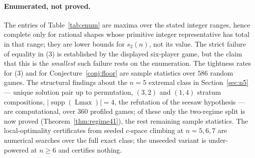 \documentclass[11pt]{article}
\newcommand{\Lmax}{\operatorname{Lmax}}
\newcommand{\supp}{\operatorname{supp}}
\begin{document}
\paragraph{Enumerated, not proved.}
The entries of Table~\ref{tab:enum} are maxima over the stated integer
ranges, hence complete only for rational shapes whose primitive integer
representative has total in that range; they are lower bounds for $s_2(n)$,
not its value.  The strict failure of equality in (3) is established by the
displayed six-player game, but the claim that this is the \emph{smallest}
such failure rests on the enumeration.  The tightness rates for (3) and for
Conjecture~\ref{conj:floor} are sample statistics over $586$ random games.
The structural findings about the $n=5$ extremal class in
Section~\ref{sec:n5} --- unique solution pair up to permutation, $(3,2)$ and
$(1,4)$ stratum compositions, $|\supp(\Lmax)|=4$, the refutation of the
seesaw hypothesis --- are computational, over $360$ profiled games; of
these only the two-regime split is now proved
(Theorem~\ref{thm:regime41}), the rest remaining sample statistics.  The local-optimality certificates from seeded $c$-space
climbing at $n=5,6,7$ are numerical searches over the full exact class; the
unseeded variant is under-powered at $n\ge6$ and certifies nothing.
\end{document}
